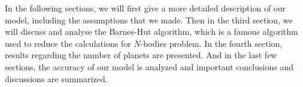 In the following sections, we will first give a more detailed description of our model, including the assumptions that we made. Then in the third section, we will discuss and analyse the Barnes-Hut algorithm, which is a famous algorithm used to reduce the calculations for $N$-bodies problem. In the fourth section, results regarding the number of planets are presented. And in the last few sections, the accuracy of our model is analyzed and important conclusions and discussions are summarized. 
 